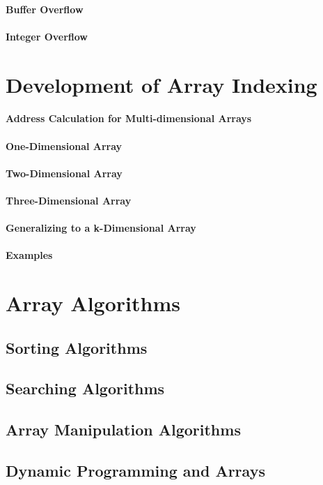\documentclass[12pt, oneside]{book}
\begin{document}
	\subsubsection{Buffer Overflow}
	\subsubsection{Integer Overflow}
	\chapter{Development of Array Indexing}
	\subsubsection{Address Calculation for Multi-dimensional Arrays}
	\subsubsection{One-Dimensional Array}
	\subsubsection{Two-Dimensional Array}
	\subsubsection{Three-Dimensional Array}
	\subsubsection{Generalizing to a k-Dimensional Array}
	\subsubsection{Examples}
	\chapter{Array Algorithms}
	\section{Sorting Algorithms}
	\section{Searching Algorithms}
	\section{Array Manipulation Algorithms}
	\section{Dynamic Programming and Arrays}
\end{document}
